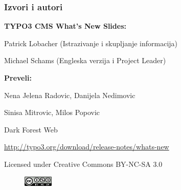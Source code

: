 \begin{frame}[fragile]
	\frametitle{Izvori i autori}

	\centerline{\textbf{TYPO3 CMS What's New Slides:}}
	\centerline{Patrick Lobacher (Istrazivanje i skupljanje informacija)}
	\centerline{Michael Schams (Engleska verzija i Project Leader)}

	\begin{center}
		\centerline{\textbf{Preveli:}}
		\centerline{Nena Jelena Radovic, Danijela Nedimovic}
		\centerline{Sinisa Mitrovic, Milos Popovic}
		\centerline{Dark Forest Web}
	\end{center}

	\smaller\begin{center}\url{http://typo3.org/download/release-notes/whats-new}\end{center}\normalsize

	\smaller\begin{center}Licensed under Creative Commons BY-NC-SA 3.0\end{center}\normalsize
	\begin{figure}
		\includegraphics[width=1.4cm]{Images/SourcesAndAuthors/CreativeCommons-BY-NC-SA.png}
	\end{figure}

\end{frame}


